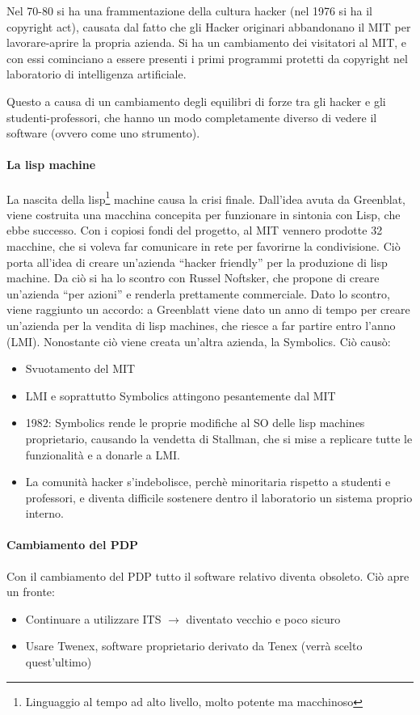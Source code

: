 Nel 70-80 si ha una frammentazione della cultura hacker (nel 1976 si ha il copyright act), causata dal fatto che gli Hacker originari abbandonano il MIT per lavorare-aprire la propria azienda. Si ha un cambiamento dei visitatori al MIT, e con essi cominciano a essere presenti i primi programmi protetti da copyright nel laboratorio di intelligenza artificiale.

Questo a causa di un cambiamento degli equilibri di forze tra gli hacker e gli studenti-professori, che hanno un modo completamente diverso di vedere il software (ovvero come uno strumento).

\paragraph*{La lisp machine} La nascita della lisp\footnote{Linguaggio al tempo ad alto livello, molto potente ma macchinoso} machine causa la crisi finale. Dall'idea avuta da Greenblat, viene costruita una macchina concepita per funzionare in sintonia con Lisp, che ebbe successo. Con i copiosi fondi del progetto, al MIT vennero prodotte 32 macchine, che si voleva far comunicare in rete per favorirne la condivisione. Ci\`o porta all'idea di creare un'azienda ``hacker friendly'' per la produzione di lisp machine. Da ci\`o si ha lo scontro con Russel Noftsker, che propone di creare un'azienda ``per azioni'' e renderla prettamente commerciale. Dato lo scontro, viene raggiunto un accordo: a Greenblatt viene dato un anno di tempo per creare un'azienda per la vendita di lisp machines, che riesce a far partire entro l'anno (LMI). Nonostante ci\`o viene creata un'altra azienda, la Symbolics. Ci\`o caus\`o:
\begin{itemize}

\item Svuotamento del MIT
\item LMI e soprattutto Symbolics attingono pesantemente dal MIT
\item 1982: Symbolics rende le proprie modifiche al SO delle lisp machines proprietario, causando la vendetta di Stallman, che si mise a replicare tutte le funzionalit\`a e a donarle a LMI.
\item La comunit\`a hacker s'indebolisce, perch\`e minoritaria rispetto a studenti e professori, e diventa difficile sostenere dentro il laboratorio un sistema proprio interno.

\end{itemize}

\paragraph*{Cambiamento del PDP} Con il cambiamento del PDP tutto il software relativo diventa obsoleto. Ci\`o apre un fronte:
\begin{itemize}

\item Continuare a utilizzare ITS $\to$ diventato vecchio e poco sicuro
\item Usare Twenex, software proprietario derivato da Tenex (verr\`a scelto quest'ultimo)

\end{itemize}

